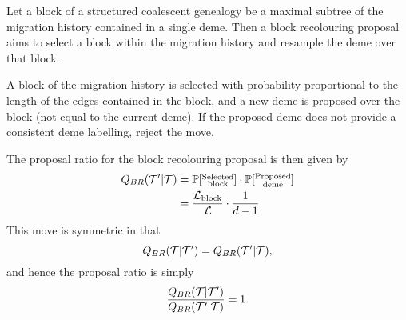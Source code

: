 Let a block of a structured coalescent genealogy be a maximal subtree of the migration history contained in a single deme. Then a block recolouring proposal aims to select a block within the migration history and resample the deme over that block.

A block of the migration history is selected with probability proportional to the length of the edges contained in the block, and a new deme is proposed over the block (not equal to the current deme). If the proposed deme does not provide a consistent deme labelling, reject the move.

The proposal ratio for the block recolouring proposal is then given by
	\begin{align*}
		Q_{BR}(\mathcal{T}' | \mathcal{T}) & = \mathbb{P} [\substack{\text{Selected} \\ \text{block}}] \cdot \mathbb{P} [\substack{\text{Proposed} \\ \text{deme}}] \\
		& = \frac{\mathcal{L}_\text{block}}{\mathcal{L}} \cdot \frac{1}{d-1}.
	\end{align*}
This move is symmetric in that
	\[
		Q_{BR} (\mathcal{T} | \mathcal{T}') = Q_{BR}(\mathcal{T}' | \mathcal{T}),
	\]
and hence the proposal ratio is simply
	\[
		\frac{Q_{BR} (\mathcal{T} | \mathcal{T}')}{Q_{BR} (\mathcal{T}' | \mathcal{T})} = 1.
	\]
